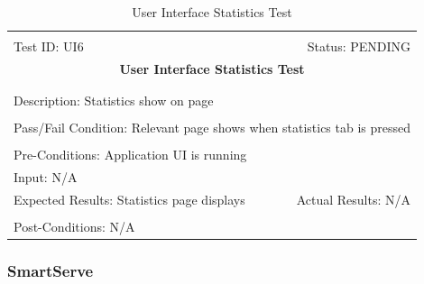 \documentclass[11pt]{article}
\begin{document}
\begin{center}
\begin{table}[H]
\begin{tabular}{|l r|}\hline&\\[-2mm]
	Test ID: UI6	&Status: PENDING \\[-3mm]
	\multicolumn{2}{|c|}{\textbf{\large{User Interface Statistics Test}}}\\&\\\hline&\\[-3mm]
	\multicolumn{2}{|p{\textwidth}|}{Description: Statistics show on page}\\[1mm]\hline&\\[-3mm]
	\multicolumn{2}{|p{\textwidth}|}{Pass/Fail Condition: Relevant page shows when statistics tab is pressed}\\[1mm]\hline&\\[-3mm]
	\multicolumn{2}{|p{\textwidth}|}{Pre-Conditions: Application UI is running}\\[4mm]
	\multicolumn{2}{|p{\textwidth}|}{Input: N/A}\\[2mm]\hline
	\multicolumn{1}{|p{0.49\textwidth}}{Expected Results: Statistics page displays}	&\multicolumn{1}{|p{0.45\textwidth}|}{Actual Results: N/A}\\\hline&\\[-3mm]
	\multicolumn{2}{|p{\textwidth}|}{Post-Conditions: N/A}\\\hline
\end{tabular}
\caption{User Interface Statistics Test}
\end{table}
\end{center}

\subsubsection{SmartServe}
\end{document}
